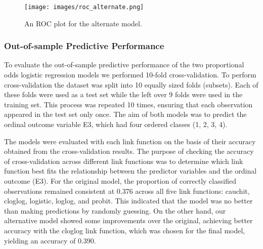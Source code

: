 \documentclass[titlepage]{article}
\begin{document}
\begin{figure}[H]
    \centering
    \texttt{[image: images/roc\_alternate.png]}
    \caption{An ROC plot for the alternate model.}
    \label{fig:roc_alter}
\end{figure}

\newpage
\restoregeometry

\subsubsection{Out-of-sample Predictive Performance}

To evaluate the out-of-sample predictive performance of the two proportional odds logistic regression models we performed 10-fold cross-validation. To perform cross-validation the dataset was split into 10 equally sized folds (subsets). Each of these folds were used as a test set while the left over 9 folds were used in the training set. This process was repeated 10 times, ensuring that each observation appeared in the test set only once. The aim of both models was to predict the ordinal outcome variable E3, which had four ordered classes (1, 2, 3, 4).

\justify
The models were evaluated with each link function on the basis of their accuracy obtained from the cross-validation results. The purpose of checking the accuracy of cross-validation across different link functions was to determine which link function best fits the relationship between the predictor variables and the ordinal outcome (E3). For the original model, the proportion of correctly classified observations remained consistent at $0.376$ across all five link functions: cauchit, cloglog, logistic, loglog, and probit. This indicated that the model was no better than making predictions by randomly guessing. On the other hand, our alternative model showed some improvements over the original, achieving better accuracy with the cloglog link function, which was chosen for the final model, yielding an accuracy of $0.390$.
\end{document}
